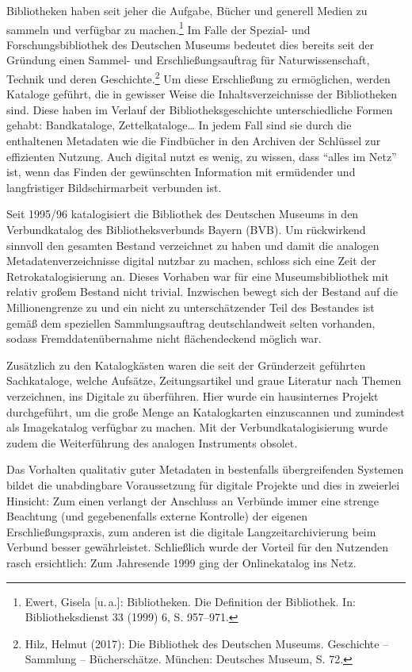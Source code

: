 \documentclass[a4paper,
fontsize=11pt,
oneside,
numbers=noperiodatend,
parskip=half-,
bibliography=totoc,
final
]{scrartcl}
\begin{document}
Bibliotheken haben seit jeher die Aufgabe, Bücher und generell Medien zu
sammeln und verfügbar zu machen.\footnote{Ewert, Gisela {[}u.\,a.{]}:
  Bibliotheken. Die Definition der Bibliothek. In: Bibliotheksdienst 33
  (1999) 6, S. 957--971.} Im Falle der Spezial- und Forschungsbibliothek
des Deutschen Museums bedeutet dies bereits seit der Gründung einen
Sammel- und Erschließungsauftrag für Naturwissenschaft, Technik und
deren Geschichte.\footnote{Hilz, Helmut (2017): Die Bibliothek des
  Deutschen Museums. Geschichte -- Sammlung -- Bücherschätze. München:
  Deutsches Museum, S. 72.} Um diese Erschließung zu ermöglichen, werden
Kataloge geführt, die in gewisser Weise die Inhaltsverzeichnisse der
Bibliotheken sind. Diese haben im Verlauf der Bibliotheksgeschichte
unterschiedliche Formen gehabt: Bandkataloge, Zettelkataloge\ldots{} In
jedem Fall sind sie durch die enthaltenen Metadaten wie die Findbücher
in den Archiven der Schlüssel zur effizienten Nutzung. Auch digital
nutzt es wenig, zu wissen, dass \enquote{alles im Netz} ist, wenn das
Finden der gewünschten Information mit ermüdender und langfristiger
Bildschirmarbeit verbunden ist.

Seit 1995/96 katalogisiert die Bibliothek des Deutschen Museums in den
Verbundkatalog des Bibliotheksverbunds Bayern (BVB). Um rückwirkend
sinnvoll den gesamten Bestand verzeichnet zu haben und damit die
analogen Metadatenverzeichnisse digital nutzbar zu machen, schloss sich
eine Zeit der Retrokatalogisierung an. Dieses Vorhaben war für eine
Museumsbibliothek mit relativ großem Bestand nicht trivial. Inzwischen
bewegt sich der Bestand auf die Millionengrenze zu und ein nicht zu
unterschätzender Teil des Bestandes ist gemäß dem speziellen
Sammlungsauftrag deutschlandweit selten vorhanden, sodass
Fremddatenübernahme nicht flächendeckend möglich war.

Zusätzlich zu den Katalogkästen waren die seit der Gründerzeit geführten
Sachkataloge, welche Aufsätze, Zeitungsartikel und graue Literatur nach
Themen verzeichnen, ins Digitale zu überführen. Hier wurde ein
hausinternes Projekt durchgeführt, um die große Menge an Katalogkarten
einzuscannen und zumindest als Imagekatalog verfügbar zu machen. Mit der
Verbundkatalogisierung wurde zudem die Weiterführung des analogen
Instruments obsolet.

Das Vorhalten qualitativ guter Metadaten in bestenfalls übergreifenden
Systemen bildet die unabdingbare Voraussetzung für digitale Projekte und
dies in zweierlei Hinsicht: Zum einen verlangt der Anschluss an Verbünde
immer eine strenge Beachtung (und gegebenenfalls externe Kontrolle) der
eigenen Erschließungspraxis, zum anderen ist die digitale
Langzeitarchivierung beim Verbund besser gewährleistet. Schließlich
wurde der Vorteil für den Nutzenden rasch ersichtlich: Zum Jahresende
1999 ging der Onlinekatalog ins Netz.
\end{document}
